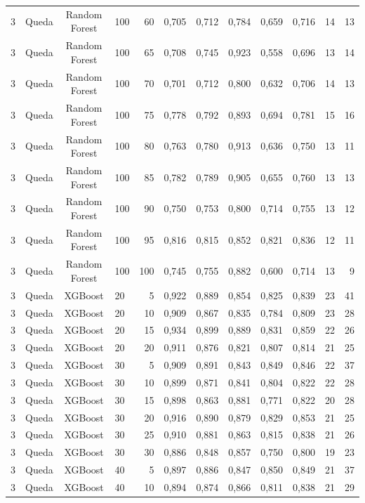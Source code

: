 \begin{longtable}{ccclrrrrrrrr}
3 & Queda & Random Forest & 100 & 60 & 0,705 & 0,712 & 0,784 & 0,659 & 0,716 & 14 & 13 \\
3 & Queda & Random Forest & 100 & 65 & 0,708 & 0,745 & 0,923 & 0,558 & 0,696 & 13 & 14 \\
3 & Queda & Random Forest & 100 & 70 & 0,701 & 0,712 & 0,800 & 0,632 & 0,706 & 14 & 13 \\
3 & Queda & Random Forest & 100 & 75 & 0,778 & 0,792 & 0,893 & 0,694 & 0,781 & 15 & 16 \\
3 & Queda & Random Forest & 100 & 80 & 0,763 & 0,780 & 0,913 & 0,636 & 0,750 & 13 & 11 \\
3 & Queda & Random Forest & 100 & 85 & 0,782 & 0,789 & 0,905 & 0,655 & 0,760 & 13 & 13 \\
3 & Queda & Random Forest & 100 & 90 & 0,750 & 0,753 & 0,800 & 0,714 & 0,755 & 13 & 12 \\
3 & Queda & Random Forest & 100 & 95 & 0,816 & 0,815 & 0,852 & 0,821 & 0,836 & 12 & 11 \\
3 & Queda & Random Forest & 100 & 100 & 0,745 & 0,755 & 0,882 & 0,600 & 0,714 & 13 & 9 \\
3 & Queda & XGBoost & 20 & 5 & 0,922 & 0,889 & 0,854 & 0,825 & 0,839 & 23 & 41 \\
3 & Queda & XGBoost & 20 & 10 & 0,909 & 0,867 & 0,835 & 0,784 & 0,809 & 23 & 28 \\
3 & Queda & XGBoost & 20 & 15 & 0,934 & 0,899 & 0,889 & 0,831 & 0,859 & 22 & 26 \\
3 & Queda & XGBoost & 20 & 20 & 0,911 & 0,876 & 0,821 & 0,807 & 0,814 & 21 & 25 \\
3 & Queda & XGBoost & 30 & 5 & 0,909 & 0,891 & 0,843 & 0,849 & 0,846 & 22 & 37 \\
3 & Queda & XGBoost & 30 & 10 & 0,899 & 0,871 & 0,841 & 0,804 & 0,822 & 22 & 28 \\
3 & Queda & XGBoost & 30 & 15 & 0,898 & 0,863 & 0,881 & 0,771 & 0,822 & 20 & 28 \\
3 & Queda & XGBoost & 30 & 20 & 0,916 & 0,890 & 0,879 & 0,829 & 0,853 & 21 & 25 \\
3 & Queda & XGBoost & 30 & 25 & 0,910 & 0,881 & 0,863 & 0,815 & 0,838 & 21 & 26 \\
3 & Queda & XGBoost & 30 & 30 & 0,886 & 0,848 & 0,857 & 0,750 & 0,800 & 19 & 23 \\
3 & Queda & XGBoost & 40 & 5 & 0,897 & 0,886 & 0,847 & 0,850 & 0,849 & 21 & 37 \\
3 & Queda & XGBoost & 40 & 10 & 0,894 & 0,874 & 0,866 & 0,811 & 0,838 & 21 & 29 \\

\end{longtable}
